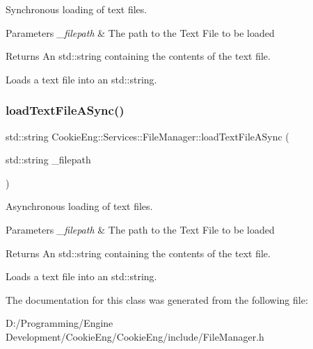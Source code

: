 Synchronous loading of text files. 


\begin{DoxyParams}{Parameters}
{\em \+\_\+filepath} & The path to the Text File to be loaded \\
\hline
\end{DoxyParams}
\begin{DoxyReturn}{Returns}
An std\+::string containing the contents of the text file.
\end{DoxyReturn}
Loads a text file into an std\+::string. \mbox{\label{class_cookie_eng_1_1_services_1_1_file_manager_abf50a7b6eb9fa88a9557254acbd2d9cc}} 
\subsubsection{\texorpdfstring{load\+Text\+File\+A\+Sync()}{loadTextFileASync()}}
{\footnotesize\ttfamily std\+::string Cookie\+Eng\+::\+Services\+::\+File\+Manager\+::load\+Text\+File\+A\+Sync (\begin{DoxyParamCaption}\item[{std\+::string}]{\+\_\+filepath }\end{DoxyParamCaption})\hspace{0.3cm}{\ttfamily [inline]}}



Asynchronous loading of text files. 


\begin{DoxyParams}{Parameters}
{\em \+\_\+filepath} & The path to the Text File to be loaded \\
\hline
\end{DoxyParams}
\begin{DoxyReturn}{Returns}
An std\+::string containing the contents of the text file.
\end{DoxyReturn}
Loads a text file into an std\+::string. 

The documentation for this class was generated from the following file\+:\begin{DoxyCompactItemize}
\item 
D\+:/\+Programming/\+Engine Development/\+Cookie\+Eng/\+Cookie\+Eng/include/File\+Manager.\+h\end{DoxyCompactItemize}
